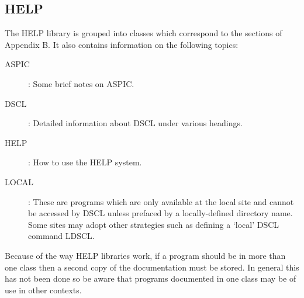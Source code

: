 \subsection {HELP}
The HELP library is grouped into classes which correspond to the sections of
Appendix B.
It also contains information on the following topics:
\begin{description}
\item [ASPIC]: Some brief notes on ASPIC.
\item [DSCL]: Detailed information about DSCL under various headings.
\item [HELP]: How to use the HELP system.
\item [LOCAL]: These are programs which are only available at the local site and
cannot be accessed by DSCL unless prefaced by a locally-defined directory name.
Some sites may adopt other strategies such as defining a `local' DSCL command
LDSCL.
\end{description}
Because of the way HELP libraries work, if a program should be in more than one
class then a second copy of the documentation must be stored.
In general this has not been done so be aware that programs documented in one
class may be of use in other contexts.
